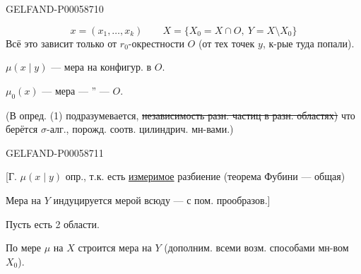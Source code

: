\begin{GelfandAdjacentEvidence}{GELFAND-P000587}{10}

\[
x=(x_1,\ldots,x_k)
\qquad
X=\{X_0=X\cap O,\ Y=X\setminus X_0\}
\]
Всё это зависит только от \(r_0\)-окрестности \(O\) (от тех точек \(y\), к-рые туда попали).

\(\mu(x\mid y)\) — мера на конфигур. в \(O\).

\(\mu_0(x)\) — мера \quad — \textquotedblright{} — \quad \(O\).

(В опред. (1) подразумевается,
\sout{независимость разн. частиц в разн. областях)}
что берётся \(\sigma\)-алг., порожд. соотв. цилиндрич. мн-вами.)
\end{GelfandAdjacentEvidence}
\begin{GelfandAdjacentEvidence}{GELFAND-P000587}{11}


[Г. \(\mu(x\mid y)\) опр., т.к. есть \underline{измеримое} разбиение (теорема Фубини — общая)

Мера на \(Y\) индуцируется мерой всюду — с пом. прообразов.]

Пусть есть 2 области.
\end{GelfandAdjacentEvidence}

По мере \(\mu\) на \(X\) строится мера на \(Y\)
(дополним. всеми возм. способами мн-вом \(X_0\)).


